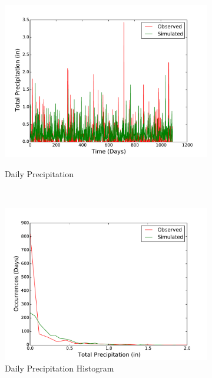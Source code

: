 \documentclass[11pt, letterpaper]{article}
\begin{document}
\begin{figure}[H]
  \centering
  \begin{subfigure}[b]{0.45\textwidth}
    \includegraphics[width=\textwidth]{figures/daily_precip.pdf}
    \label{fig:analysis-raw}
    \caption{Daily Precipitation}
  \end{subfigure}
  ~
  \begin{subfigure}[b]{0.45\textwidth}
    \includegraphics[width=\textwidth]{figures/daily_precip_hist.pdf}
    \caption{Daily Precipitation Histogram}
  \end{subfigure}
  ~
  \begin{subfigure}[b]{0.45\textwidth}

\end{subfigure}
\end{figure}
\end{document}
